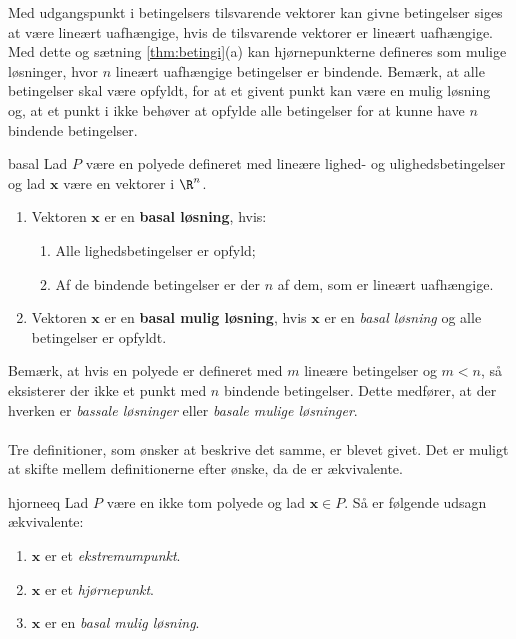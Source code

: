 %
Med udgangspunkt i betingelsers tilsvarende vektorer kan givne betingelser siges at være lineært uafhængige, hvis de tilsvarende vektorer er lineært uafhængige.
Med dette og sætning \ref{thm:betingi}(a) kan hjørnepunkterne defineres som mulige løsninger, hvor $n$ lineært uafhængige betingelser er bindende.
Bemærk, at alle betingelser skal være opfyldt, for at et givent punkt kan være en mulig løsning og, at et punkt i ikke behøver at opfylde alle betingelser for at kunne have $n$ bindende betingelser.
%
\begin{defn}{}{basal}
Lad $P$ være en polyede defineret med lineære lighed- og ulighedsbetingelser og lad $\textbf{x}$ være en vektorer i $\R^n$.
%
\begin{enumerate}[label=(\alph*)]
\item Vektoren $\textbf{x}$ er en \textbf{basal løsning}, hvis:
%
\begin{enumerate}[label=(\roman*)]
\item Alle lighedsbetingelser er opfyld;
\item Af de bindende betingelser er der $n$ af dem, som er lineært uafhængige.
\end{enumerate}
%
\item Vektoren $\textbf{x}$ er en \textbf{basal mulig løsning}, hvis $\textbf{x}$ er en \textit{basal løsning} og alle betingelser er opfyldt.
\end{enumerate}
\end{defn}\noindent
%
Bemærk, at hvis en polyede er defineret med $m$ lineære betingelser og $m<n$, så eksisterer der ikke et punkt med $n$ bindende betingelser.
Dette medfører, at der hverken er \textit{bassale løsninger} eller \textit{basale mulige løsninger}.\\\\
%
Tre definitioner, som ønsker at beskrive det samme, er blevet givet.
Det er muligt at skifte mellem definitionerne efter ønske, da de er ækvivalente.
%
\begin{thm}{}{hjorneeq}
Lad $P$ være en ikke tom polyede og lad $\textbf{x}\in P$.
Så er følgende udsagn ækvivalente:
%
\begin{enumerate}[label=(\alph*)]
\item $\textbf{x}$ er et \textit{ekstremumpunkt}.
\item $\textbf{x}$ er et \textit{hjørnepunkt}.
\item $\textbf{x}$ er en \textit{basal mulig løsning}.
\end{enumerate}
%
\end{thm}
